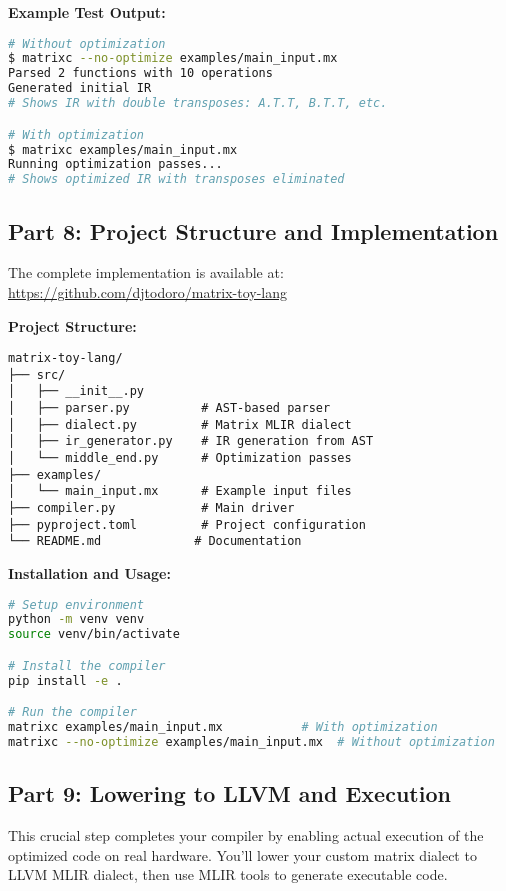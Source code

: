 \documentclass[11pt,a4paper]{article}
\begin{document}
\textbf{Example Test Output:}
\begin{lstlisting}[language=bash, caption=Running the Compiler]
# Without optimization
$ matrixc --no-optimize examples/main_input.mx
Parsed 2 functions with 10 operations
Generated initial IR
# Shows IR with double transposes: A.T.T, B.T.T, etc.

# With optimization  
$ matrixc examples/main_input.mx
Running optimization passes...
# Shows optimized IR with transposes eliminated
\end{lstlisting}

\subsection{Part 8: Project Structure and Implementation}

The complete implementation is available at: \url{https://github.com/djtodoro/matrix-toy-lang}

\textbf{Project Structure:}
\begin{lstlisting}[caption=Repository Structure]
matrix-toy-lang/
├── src/
│   ├── __init__.py
│   ├── parser.py          # AST-based parser
│   ├── dialect.py         # Matrix MLIR dialect
│   ├── ir_generator.py    # IR generation from AST
│   └── middle_end.py      # Optimization passes
├── examples/
│   └── main_input.mx      # Example input files
├── compiler.py            # Main driver
├── pyproject.toml         # Project configuration
└── README.md             # Documentation
\end{lstlisting}

\textbf{Installation and Usage:}
\begin{lstlisting}[language=bash]
# Setup environment
python -m venv venv
source venv/bin/activate

# Install the compiler
pip install -e .

# Run the compiler
matrixc examples/main_input.mx           # With optimization
matrixc --no-optimize examples/main_input.mx  # Without optimization
\end{lstlisting}

\subsection{Part 9: Lowering to LLVM and Execution}

This crucial step completes your compiler by enabling actual execution of the optimized code on real hardware. You'll lower your custom matrix dialect to LLVM MLIR dialect, then use MLIR tools to generate executable code.
\end{document}
